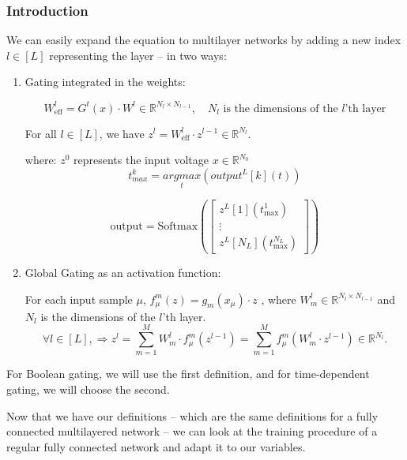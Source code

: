 \subsubsection{Introduction}

We can easily expand the equation to multilayer networks by adding a new index $l \in [L]$ representing the layer – in two ways:

\begin{enumerate}
    \item Gating integrated in the weights:


\begin{equation}
    W_{\text{eff}}^l = G^t(x) \cdot W^l \in \mathbb{R}^{N_l \times N_{l-1}}, \quad N_l \text{ is the dimensions of the } l\text{'th layer}
\end{equation}

For all $l \in [L]$, we have $z^l = W_{\text{eff}}^l \cdot z^{l-1} \in \mathbb{R}^{N_l}$.

where:
$z^0$ represents the input voltage $x \in \mathbb{R}^{N_0}$
\begin{equation}
    t^k_{max} = \underset{t}{argmax} \left( 
    output^L[k](t)
    \right)
\end{equation}

\begin{equation}
    {\text{output}} = \text{Softmax}\left(\begin{bmatrix} z^L[1](t_{\text{max}}^1) \\ \vdots \\ z^L[N_L](t_{\text{max}}^{N_L}) \end{bmatrix}\right)
\end{equation}

    \item Global Gating as an activation function:

For each input sample $\mu$,  $f_\mu^m(z) = g_m(x_\mu) \cdot z$ ,
where $W_m^l \in \mathbb{R}^{N_l \times N_{l-1}}$ and $N_l$ is the dimensions of the $l$'th layer. \\

\begin{equation}
    \forall l \in [L] , \Rightarrow z^l = \sum_{m=1}^M W_m^l \cdot f_\mu^m(z^{l-1}) = \sum_{m=1}^M f_\mu^m(W_m^l \cdot z^{l-1}) \in \mathbb{R}^{N_l}.
\end{equation}

\end{enumerate}

For Boolean gating, we will use the first definition, and for time-dependent gating, we will choose the second.

Now that we have our definitions – which are the same definitions for a fully connected multilayered network – we can look at the training procedure of a regular fully connected network and adapt it to our variables.
